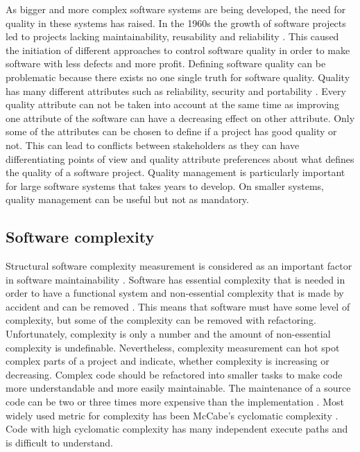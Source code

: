 As bigger and more complex software systems are being developed, the need for quality in these systems has raised. In the 1960s the growth of software projects led to projects lacking maintainability, reusability and reliability \cite{sommerville2011software}. This caused the initiation of different approaches to control software quality in order to make software with less defects and more profit. Defining software quality can be problematic because there exists no one single truth for software quality. Quality has many different attributes such as reliability, security and portability \cite{sommerville2011software}. Every quality attribute can not be taken into account at the same time as improving one attribute of the software can have a decreasing effect on other attribute. Only some of the attributes can be chosen to define if a project has good quality or not. This can lead to conflicts between stakeholders as they can have differentiating points of view and quality attribute preferences about what defines the quality of a software project. Quality management is particularly important for large software systems that takes years to develop. On smaller systems, quality management can be useful but not as mandatory.

\subsection{Software complexity}
\label{chap:complexity}

Structural software complexity measurement is considered as an important factor in software maintainability \cite{banker1989software}. Software has essential complexity that is needed in order to have a functional system and non-essential complexity that is made by accident and can be removed \cite{softcomplex2014}. This means that software must have some level of complexity, but some of the complexity can be removed with refactoring. Unfortunately, complexity is only a number and the amount of non-essential complexity is undefinable. Nevertheless, complexity measurement can hot spot complex parts of a project and indicate, whether complexity is increasing or decreasing. Complex code should be refactored into smaller tasks to make code more understandable and more easily maintainable.  The maintenance of a source code can be two or three times more expensive than the implementation \cite{banker1989software}. Most widely used metric for complexity has been McCabe’s cyclomatic complexity \cite{banker1989software}. Code with high cyclomatic complexity has many independent execute paths and is difficult to understand. 

